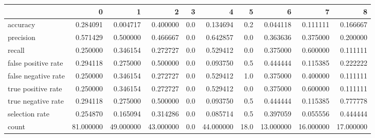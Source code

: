 \begin{tabular}{lrrrrrrrrr}
\toprule
{} &          0 &          1 &          2 &    3 &          4 &     5 &          6 &          7 &          8 \\
\midrule
accuracy            &   0.284091 &   0.004717 &   0.400000 &  0.0 &   0.134694 &   0.2 &   0.044118 &   0.111111 &   0.166667 \\
precision           &   0.571429 &   0.500000 &   0.466667 &  0.0 &   0.642857 &   0.0 &   0.363636 &   0.375000 &   0.200000 \\
recall              &   0.250000 &   0.346154 &   0.272727 &  0.0 &   0.529412 &   0.0 &   0.375000 &   0.600000 &   0.111111 \\
false positive rate &   0.294118 &   0.275000 &   0.500000 &  0.0 &   0.093750 &   0.5 &   0.444444 &   0.115385 &   0.222222 \\
false negative rate &   0.250000 &   0.346154 &   0.272727 &  0.0 &   0.529412 &   1.0 &   0.375000 &   0.400000 &   0.111111 \\
true positive rate  &   0.250000 &   0.346154 &   0.272727 &  0.0 &   0.529412 &   0.0 &   0.375000 &   0.600000 &   0.111111 \\
true negative rate  &   0.294118 &   0.275000 &   0.500000 &  0.0 &   0.093750 &   0.5 &   0.444444 &   0.115385 &   0.777778 \\
selection rate      &   0.254870 &   0.165094 &   0.314286 &  0.0 &   0.085714 &   0.5 &   0.397059 &   0.055556 &   0.444444 \\
count               &  81.000000 &  49.000000 &  43.000000 &  0.0 &  44.000000 &  18.0 &  13.000000 &  16.000000 &  17.000000 \\
\bottomrule
\end{tabular}
